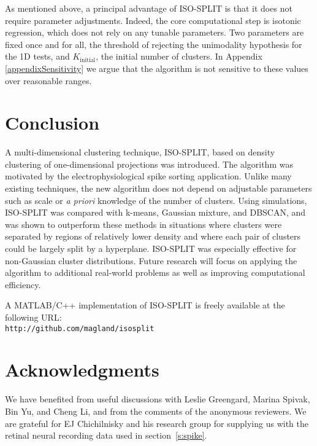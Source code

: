 \documentclass[10pt]{article}
\begin{document}
As mentioned above, a principal advantage of ISO-SPLIT is that it does not require parameter adjustments. Indeed, the core computational step is isotonic regression, which does not rely on any tunable parameters. Two parameters are fixed once and for all, the threshold of rejecting the unimodality hypothesis for the 1D tests, and $K_\text{initial}$, the initial number of clusters. In Appendix \ref{appendixSensitivity} we argue that the algorithm is not sensitive to these values over reasonable ranges.

\section{Conclusion}
\label{s:conc}

A multi-dimensional clustering technique, ISO-SPLIT, based on density clustering of one-dimensional projections was introduced. The algorithm was motivated by the electrophysiological spike sorting application. Unlike many existing techniques, the new algorithm does not depend on adjustable parameters such as scale or \emph{a priori} knowledge of the number of clusters. Using simulations, ISO-SPLIT was compared with k-means, Gaussian mixture, and DBSCAN, and was shown to outperform these methods in situations where clusters were separated by regions of relatively lower density and where each pair of clusters could be largely split by a hyperplane. ISO-SPLIT was especially effective for non-Gaussian cluster distributions. Future research will focus on applying the algorithm to additional real-world problems as well as improving computational efficiency.

A MATLAB/C++ implementation of ISO-SPLIT is freely available
at the following URL:\\
{\tt http://github.com/magland/isosplit}

\section*{Acknowledgments}

We have benefited from useful discussions with Leslie Greengard,
Marina Spivak, Bin Yu, and Cheng Li, and from the comments of the anonymous reviewers.
We are grateful for EJ Chichilnisky and his research group
for supplying us with the retinal neural recording data used
in section~\ref{s:spike}.

\appendix %


\end{document}
